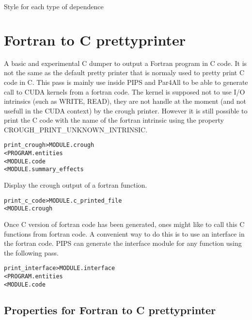 \documentclass[a4paper]{report}
\newenvironment{PipsMake}{\begin{alltt}}{\end{alltt}}
\newenvironment{PipsPass}[1]{\label{pass:#1}}{}
\begin{document}
Style for each type of dependence


\section{Fortran to C prettyprinter}

\begin{PipsPass}{print_crough}
A basic and experimental C dumper to output a Fortran program in C
code. It is not the same as the default pretty printer that is normaly used
to pretty print C code in C. This pass is mainly use inside PIPS
and Par4All to be able to generate call to CUDA kernels from a fortran code.
The kernel is supposed not to use I/O intrinsics (such as WRITE, READ),
they are not handle at the moment (and not usefull in the CUDA context)
by the crough printer. However it is still possible to print the C code with
the name of the fortran intrinsic using the property
CROUGH\_PRINT\_UNKNOWN\_INTRINSIC.
\end{PipsPass}

\begin{PipsMake}
print_crough  > MODULE.crough
              < PROGRAM.entities
              < MODULE.code
              < MODULE.summary_effects
\end{PipsMake}

\begin{PipsPass}{print_c_code}
Display the crough output of a fortran function.
\end{PipsPass}

\begin{PipsMake}
print_c_code  > MODULE.c_printed_file
              < MODULE.crough
\end{PipsMake}

\begin{PipsPass}{print_interface}
Once C version of fortran code has been generated, ones might like to call this
C functions from fortran code. A convenient way to do this is to use an
interface in the fortran code. PIPS can generate the interface module for any
function using the following pass.
\end{PipsPass}

\begin{PipsMake}
print_interface  > MODULE.interface
                 < PROGRAM.entities
                 < MODULE.code
\end{PipsMake}

\subsection{Properties for Fortran to C prettyprinter}
\end{document}
